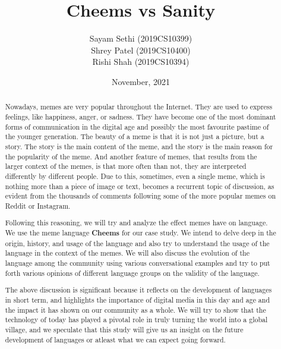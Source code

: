 \documentclass{article}
\title{Cheems vs Sanity}
\author{Sayam Sethi (2019CS10399)\\Shrey Patel (2019CS10400)\\Rishi Shah (2019CS10394)}
\date{November, 2021}
\begin{document}
\maketitle

\tableofcontents

\newpage

\begin{abstract}
    Nowadays, memes are very popular throughout the Internet. They are used to express feelings, like happiness, anger, or sadness. They have become one of the most dominant forms of communication in the digital age and possibly the most favourite pastime of the younger generation. The beauty of a meme is that it is not just a picture, but a story. The story is the main content of the meme, and the story is the main reason for the popularity of the meme. And another feature of memes, that results from the larger context of the memes,  is that more often than not, they are interpreted differently by different people. Due to this, sometimes, even a single meme, which is nothing more than a piece of image or text, becomes a recurrent topic of discussion, as evident from the thousands of comments following some of the more popular memes on Reddit or Instagram.

    Following this reasoning, we will try and analyze the effect memes have on language. We use the meme language \textbf{Cheems} for our case study. We intend to delve deep in the origin, history, and usage of the language and also try to understand the usage of the language in the context of the memes. We will also discuss the evolution of the language among the community using various conversational examples and try to put forth various opinions of different language groups on the validity of the language.

    The above discussion is significant because it reflects on the development of languages in short term, and highlights the importance of digital media in this day and age and the impact it has shown on our community as a whole. We will try to show that the technology of today has played a pivotal role in truly turning the world into a global village, and we speculate that this study will give us an insight on the future development of languages or atleast what we can expect going forward.
\end{abstract}
\end{document}
